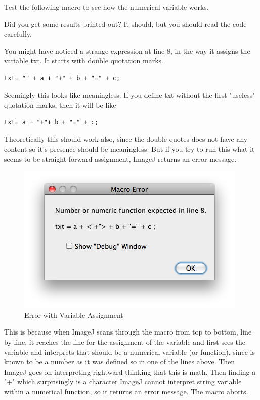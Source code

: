 Test the following macro to see how the numerical variable works. 

Did you get some results printed out? It should, but you should read the code carefully. 

You might have noticed a strange expression at line 8, in the way it assigns the variable txt. 
It starts with double quotation marks. \\
%
\begin{lstlisting}[numbers=none]
txt= "" + a + "+" + b + "=" + c;
\end{lstlisting}
Seemingly this looks like meaningless. 
If you define txt without the first "useless" quotation marks, then it will be like\\
\begin{lstlisting}[numbers=none]
txt= a + "+"+ b + "=" + c;
\end{lstlisting}
Theoretically this should work also, 
since the double quotes does not have any content so it's presence should be meaningless. But if you try to run this what it seems to be straight-forward assignment, 
ImageJ returns an error message. 

\begin{figure}[htbp]
\begin{center}
\includegraphics[scale=0.6]{fig/ErrorStringNumericFunction.png}
\caption{Error with Variable Assignment} \label{fig_ErrorVariable}
\end{center}
\end{figure}

This is because when ImageJ scans through the macro from top to bottom, line by line, 
it reaches the line for the assignment of the variable  and first sees the variable  and interprets that  should be a numerical variable 
(or function), since  is known to be a number as it was defined so in one of the lines above. Then ImageJ goes on interpreting rightward thinking that this is math. Then finding a "+" which surprisingly is a character
ImageJ cannot interpret string variable within a numerical function, so it returns an error message. The macro aborts.  

